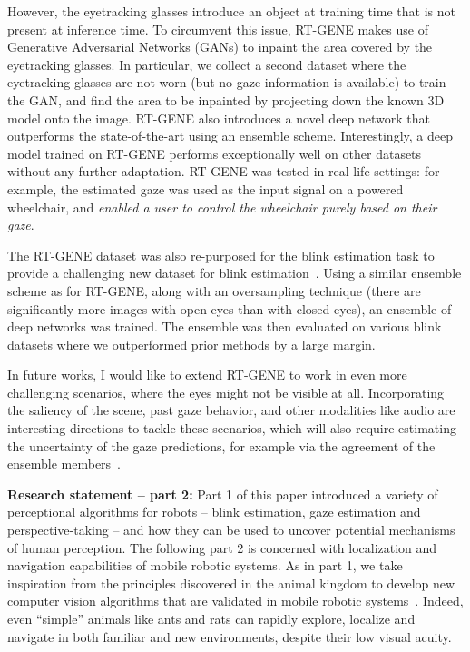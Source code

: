 \documentclass[conference]{IEEEtran}
\begin{document}
However, the eyetracking glasses introduce an object at training time that is not present at inference time. To circumvent this issue, RT-GENE makes use of Generative Adversarial Networks (GANs) to inpaint the area covered by the eyetracking glasses. In particular, we collect a second dataset where the eyetracking glasses are not worn (but no gaze information is available) to train the GAN, and find the area to be inpainted by projecting down the known 3D model onto the image. RT-GENE also introduces a novel deep network that outperforms the state-of-the-art using an ensemble scheme. Interestingly, a deep model trained on RT-GENE performs exceptionally well on other datasets without any further adaptation. RT-GENE was tested in real-life settings: for example, the estimated gaze was used as the input signal on a powered wheelchair, and \emph{enabled a user to control the wheelchair purely based on their gaze}.

The RT-GENE dataset was also re-purposed for the blink estimation task to provide a challenging new dataset for blink estimation~\cite{Cortacero2019}. Using a similar ensemble scheme as for RT-GENE, along with an oversampling technique (there are significantly more images with open eyes than with closed eyes), an ensemble of deep networks was trained. The ensemble was then evaluated on various blink datasets where we outperformed prior methods by a large margin.

In future works, I would like to extend RT-GENE to work in even more challenging scenarios, where the eyes might not be visible at all. Incorporating the saliency of the scene, past gaze behavior, and other modalities like audio are interesting directions to tackle these scenarios, which will also require estimating the uncertainty of the gaze predictions, for example via the agreement of the ensemble members~\cite{lakshminarayanan2016simple}.
%

%

\textbf{Research statement -- part 2:} Part 1 of this paper introduced a variety of perceptional algorithms for robots -- blink estimation, gaze estimation and perspective-taking -- and how they can be used to uncover potential mechanisms of human perception. The following part 2 is concerned with localization and navigation capabilities of mobile robotic systems. As in part 1, we take inspiration from the principles discovered in the animal kingdom to develop new computer vision algorithms that are validated in mobile robotic systems~\cite{DallOsto2020,Fischer2020RAL,FischerGargIJCAI2021,Hausler2021}. Indeed, even ``simple'' animals like ants and rats can rapidly explore, localize and navigate in both familiar and new environments, despite their low visual acuity.
\end{document}
